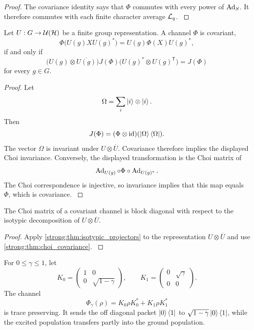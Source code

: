 \begin{proof}\label{strong:proof:034}
The covariance identity says that \(\Phi\) commutes with every power of \(\operatorname{Ad}_S\). It therefore commutes with each finite character average \(\mathcal L_q\).
\label{strong:proof:034:end}\end{proof}

\begin{theorem}\label{strong:theorem:024}\label{strong:thm:choi_covariance}
Let \(U:G\to\mathcal U(\mathcal H)\) be a finite group representation. A channel \(\Phi\) is covariant,
\[
\Phi\bigl(U(g)XU(g)^*\bigr)
=
U(g)\Phi(X)U(g)^*,
\]
if and only if
\[
\bigl(U(g)\otimes\overline{U(g)}\bigr)
J(\Phi)
\bigl(U(g)^*\otimes U(g)^{\mathsf T}\bigr)
=
J(\Phi)
\]
for every \(g\in G\).
\end{theorem}

\begin{proof}\label{strong:proof:035}
Let
\[
\Omega=\sum_i\left|i\right\rangle\otimes\left|i\right\rangle.
\]
Then
\[
J(\Phi)=(\Phi\otimes\mathrm{id})(\left|\Omega\right\rangle\left\langle\Omega\right|).
\]
The vector \(\Omega\) is invariant under \(U\otimes\overline U\). Covariance therefore implies the displayed Choi invariance. Conversely, the displayed transformation is the Choi matrix of
\[
\operatorname{Ad}_{U(g)}\circ\Phi\circ\operatorname{Ad}_{U(g)^*}.
\]
The Choi correspondence is injective, so invariance implies that this map equals \(\Phi\), which is covariance.
\label{strong:proof:035:end}\end{proof}

\begin{corollary}\label{strong:corollary:009}\label{strong:cor:choi_packets}
The Choi matrix of a covariant channel is block diagonal with respect to the isotypic decomposition of \(U\otimes\overline U\).
\end{corollary}

\begin{proof}\label{strong:proof:036}
Apply \cref{strong:thm:isotypic_projectors} to the representation \(U\otimes\overline U\) and use \cref{strong:thm:choi_covariance}.
\label{strong:proof:036:end}\end{proof}

\begin{example}\label{strong:example:002}\label{strong:ex:amplitude_damping}
For \(0\leq\gamma\leq1\), let
\[
K_0=
\begin{pmatrix}
1&0\\
0&\sqrt{1-\gamma}
\end{pmatrix},
\qquad
K_1=
\begin{pmatrix}
0&\sqrt\gamma\\
0&0
\end{pmatrix}.
\]
The channel
\[
\Phi_\gamma(\rho)=K_0\rho K_0^*+K_1\rho K_1^*
\]
is trace preserving. It sends the off diagonal packet \(\left|0\right\rangle\left\langle1\right|\) to \(\sqrt{1-\gamma}\left|0\right\rangle\left\langle1\right|\), while the excited population transfers partly into the ground population.
\end{example}

